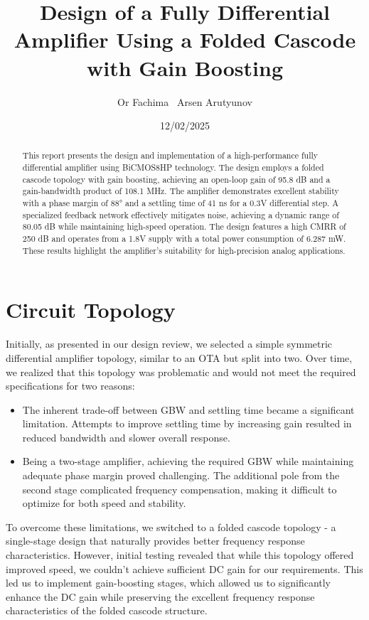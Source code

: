 \documentclass[a4paper,12pt]{article}
\title{Design of a Fully Differential Amplifier Using a Folded Cascode with Gain Boosting}
\author{Or Fachima  \ Arsen Arutyunov }
\date{12/02/2025}
\begin{document}
\maketitle
\begin{abstract}
This report presents the design and implementation of a high-performance fully differential amplifier using BiCMOS8HP technology. The design employs a folded cascode topology with gain boosting, achieving an open-loop gain of 95.8 dB and a gain-bandwidth product of 108.1 MHz. The amplifier demonstrates excellent stability with a phase margin of 88° and a settling time of 41 ns for a 0.3V differential step. A specialized feedback network effectively mitigates noise, achieving a dynamic range of 80.05 dB while maintaining high-speed operation. The design features a high CMRR of 250 dB and operates from a 1.8V supply with a total power consumption of 6.287 mW. These results highlight the amplifier’s suitability for high-precision analog applications.
\end{abstract}



\section{Circuit Topology}
Initially, as presented in our design review, we selected a simple symmetric differential amplifier topology, similar to an OTA but split into two. Over time, we realized that this topology was problematic and would not meet the required specifications for two reasons:

\begin{itemize}
    \item The inherent trade-off between GBW and settling time became a significant limitation. Attempts to improve settling time by increasing gain resulted in reduced bandwidth and slower overall response.
    
    \item Being a two-stage amplifier, achieving the required GBW while maintaining adequate phase margin proved challenging. The additional pole from the second stage complicated frequency compensation, making it difficult to optimize for both speed and stability.
\end{itemize}

To overcome these limitations, we switched to a folded cascode topology - a single-stage design that naturally provides better frequency response characteristics. However, initial testing revealed that while this topology offered improved speed, we couldn't achieve sufficient DC gain for our requirements. This led us to implement gain-boosting stages, which allowed us to significantly enhance the DC gain while preserving the excellent frequency response characteristics of the folded cascode structure.
\end{document}
